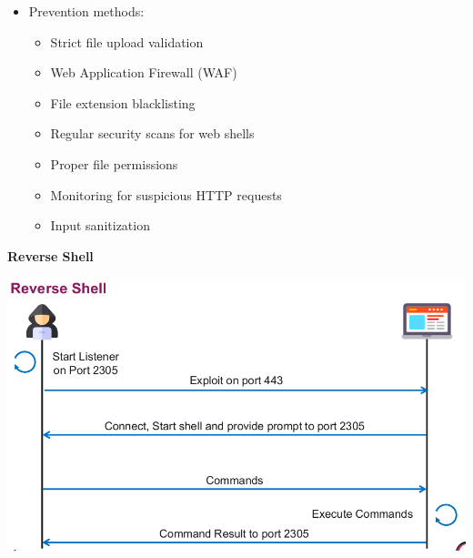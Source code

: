 \begin{itemize}
	\item Prevention methods:
    \begin{itemize}
        \tightlist
		\item Strict file upload validation
		\item Web Application Firewall (WAF)
		\item File extension blacklisting
		\item Regular security scans for web shells
		\item Proper file permissions
		\item Monitoring for suspicious HTTP requests
		\item Input sanitization
    \end{itemize}
\end{itemize}

\textbf{Reverse Shell}
\begin{center}
    \includegraphics[scale=0.5]{resources/02-reverse-shell.png}
\end{center}
